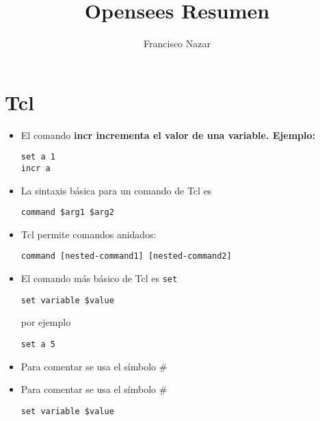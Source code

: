 \documentclass{article}
\title{Opensees Resumen}
\author{Francisco Nazar}
\date{ }
\begin{document}
\maketitle
\section{Tcl}

\begin{itemize}
\item El comando \bf incr \rm incrementa el valor de una variable. Ejemplo:
\begin{verbatim}
set a 1
incr a
\end{verbatim}

\item La sintaxis básica para un comando de Tcl es 
\begin{verbatim}
command $arg1 $arg2
\end{verbatim}


\item Tcl permite comandos anidados: 
\begin{verbatim}
command [nested-command1] [nested-command2]
\end{verbatim}


\item El comando más básico de Tcl es \tt set \rm 
\begin{verbatim}
set variable $value
\end{verbatim}
por ejemplo 

\begin{verbatim}
set a 5
\end{verbatim}

\item Para comentar se usa el símbolo #

\item Para comentar se usa el símbolo #
\begin{verbatim}
set variable $value
\end{verbatim}



\end{itemize}
\end{document}
